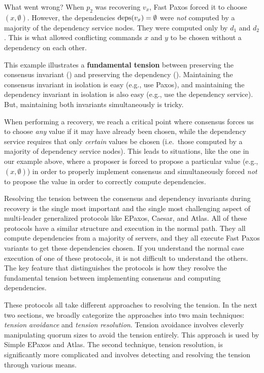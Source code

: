 What went wrong? When $p_2$ was recovering $v_x$, Fast Paxos forced it to
choose $(x, \emptyset{})$. However, the dependencies $\text{deps}(v_x) = \emptyset{}$
were \emph{not} computed by a majority of the dependency service nodes. They
were computed only by $d_1$ and $d_2$. This is what allowed conflicting
commands $x$ and $y$ to be chosen without a dependency on each other.

This example illustrates a \textbf{fundamental tension} between preserving the
consensus invariant () and preserving the dependency
(). Maintaining the consensus invariant in isolation
is easy (e.g., use Paxos), and maintaining the dependency invariant in
isolation is also easy (e.g., use the dependency service). But, maintaining
both invariants simultaneously is tricky.

When performing a recovery, we reach a critical point where consensus forces us
to choose \emph{any} value if it may have already been chosen, while the
dependency service requires that only \emph{certain} values be chosen (i.e.\
those computed by a majority of dependency service nodes).
%
This leads to situations, like the one in our example above, where a proposer
is forced to propose a particular value (e.g., $(x, \emptyset{})$) in order to
properly implement consensus and simultaneously forced \emph{not} to propose
the value in order to correctly compute dependencies.

Resolving the tension between the consensus and dependency invariants during
recovery is the single most important and the single most challenging aspect of
multi-leader generalized protocols like EPaxos, Caesar, and Atlas. All of these
protocols have a similar structure and execution in the normal path. They all
compute dependencies from a majority of servers, and they all execute Fast
Paxos variants to get these dependencies chosen. If you understand the normal
case execution of one of these protocols, it is not difficult to understand the
others. The key feature that distinguishes the protocols is how they resolve
the fundamental tension between implementing consensus and computing
dependencies.

These protocols all take different approaches to resolving the tension. In the
next two sections, we broadly categorize the approaches into two main
techniques: \emph{tension avoidance} and \emph{tension resolution}.  Tension
avoidance involves cleverly manipulating quorum sizes to avoid the tension
entirely. This approach is used by Simple EPaxos and Atlas. The second
technique, tension resolution, is significantly more complicated and involves
detecting and resolving the tension through various means.


